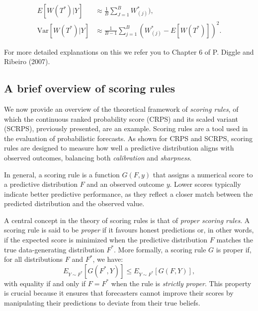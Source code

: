 \documentclass[
  letterpaper,
]{krantz}
\begin{document}
\begin{align}
E[W(T^*) | Y] &\approx  \frac{1}{B} \sum_{J=1}^B W^{*}_{(j)}), \\
\text{Var}[W(T^*) | Y] &\approx \frac{1}{B-1} \sum_{j=1}^B \left( W^{*}_{(j)} - E[W(T^*)] \right)^2.
\end{align}

For more detailed explanations on this we refer you to Chapter 6 of P.
Diggle and Ribeiro (2007).

\subsection{A brief overview of scoring
rules}\label{a-brief-overview-of-scoring-rules}

We now provide an overview of the theoretical framework of \emph{scoring
rules}, of which the continuous ranked probability score (CRPS) and its
scaled variant (SCRPS), previously presented, are an example. Scoring
rules are a tool used in the evaluation of probabilistic forecasts. As
shown for CRPS and SCRPS, scoring rules are designed to measure how well
a predictive distribution aligns with observed outcomes, balancing both
\emph{calibration} and \emph{sharpness}.

In general, a scoring rule is a function \(G(F, y)\) that assigns a
numerical score to a predictive distribution \(F\) and an observed
outcome \(y\). Lower scores typically indicate better predictive
performance, as they reflect a closer match between the predicted
distribution and the observed value.

A central concept in the theory of scoring rules is that of \emph{proper
scoring rules}. A scoring rule is said to be \emph{proper} if it favours
honest predictions or, in other words, if the expected score is
minimized when the predictive distribution \(F\) matches the true
data-generating distribution \(F^*\). More formally, a scoring rule
\(G\) is proper if, for all distributions \(F\) and \(F^*\), we have: \[
E_{Y \sim F^*}[G(F^*, Y)] \leq E_{Y \sim F^*}[G(F, Y)],
\] with equality if and only if \(F = F^*\) when the rule is
\emph{strictly proper}. This property is crucial because it ensures that
forecasters cannot improve their scores by manipulating their
predictions to deviate from their true beliefs.
\end{document}
